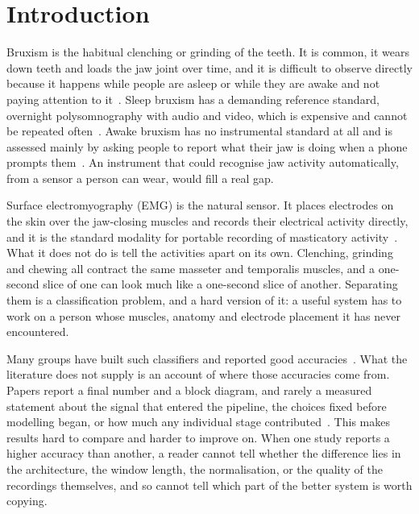 \documentclass[pdflatex,sn-nature,iicol]{sn-jnl}
\begin{document}

\maketitle

\section{Introduction}

Bruxism is the habitual clenching or grinding of the teeth. It is common, it wears down teeth and loads the jaw joint over time, and it is difficult to observe directly because it happens while people are asleep or while they are awake and not paying attention to it~\cite{lavigne2008bruxism,manfredini2013epidemiology,melo2019bruxism,wetselaar2019prevalence}. Sleep bruxism has a demanding reference standard, overnight polysomnography with audio and video, which is expensive and cannot be repeated often~\cite{lavigne1996sleep}. Awake bruxism has no instrumental standard at all and is assessed mainly by asking people to report what their jaw is doing when a phone prompts them~\cite{bracci2018frequency,zani2019ecological}. An instrument that could recognise jaw activity automatically, from a sensor a person can wear, would fill a real gap.

Surface electromyography (EMG) is the natural sensor. It places electrodes on the skin over the jaw-closing muscles and records their electrical activity directly, and it is the standard modality for portable recording of masticatory activity~\cite{raez2006techniques,colonna2023electromyographic,thymi2021signal}. What it does not do is tell the activities apart on its own. Clenching, grinding and chewing all contract the same masseter and temporalis muscles, and a one-second slice of one can look much like a one-second slice of another. Separating them is a classification problem, and a hard version of it: a useful system has to work on a person whose muscles, anatomy and electrode placement it has never encountered.

Many groups have built such classifiers and reported good accuracies~\cite{sonmezocak2021detection,gul2024advanced,heyat2020computational,lan2022comparative}. What the literature does not supply is an account of where those accuracies come from. Papers report a final number and a block diagram, and rarely a measured statement about the signal that entered the pipeline, the choices fixed before modelling began, or how much any individual stage contributed~\cite{thymi2021signal,cidverdejo2024instrumental}. This makes results hard to compare and harder to improve on. When one study reports a higher accuracy than another, a reader cannot tell whether the difference lies in the architecture, the window length, the normalisation, or the quality of the recordings themselves, and so cannot tell which part of the better system is worth copying.
\end{document}
